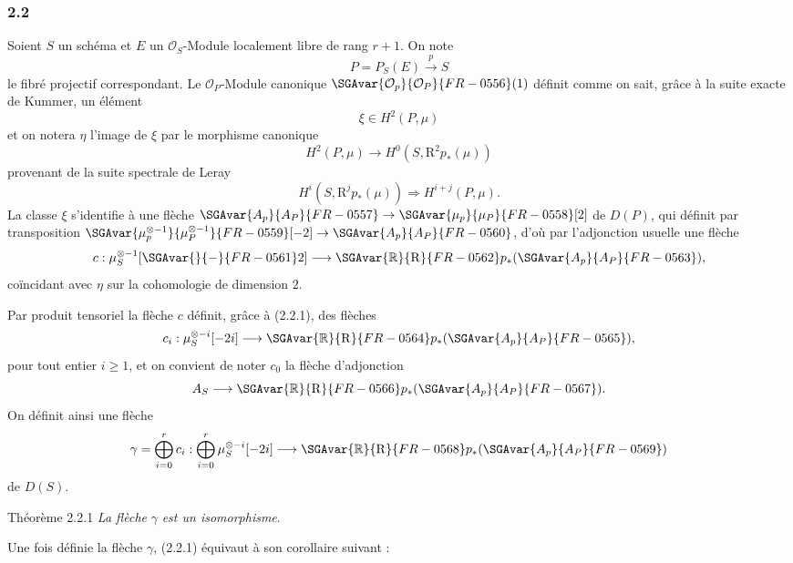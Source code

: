 \subsubsection*{2.2}
Soient $S$ un schéma et $E$ un $\mathcal{O}_S$-Module localement libre de rang $r+1$. On note
\[
P=P_S(E)\xrightarrow{p}S
\]
le fibré projectif correspondant. Le $\mathcal{O}_P$-Module canonique $\SGAvar{\mathcal{O}_p}{\mathcal{O}_P}{FR-0556}(1)$ définit comme on sait, grâce à la suite exacte de Kummer, un élément
\[
\xi\in H^2(P,\mu)
\]
et on notera $\eta$ l'image de $\xi$ par le morphisme canonique
\[
H^2(P,\mu)\longrightarrow H^0(S,\mathrm{R}^2p_*(\mu))
\]
provenant de la suite spectrale de Leray
\[
H^i(S,\mathrm{R}^jp_*(\mu))\Rightarrow H^{i+j}(P,\mu).
\]
La classe $\xi$ s'identifie à une flèche $\SGAvar{A_p}{A_P}{FR-0557}\to\SGAvar{\mu_p}{\mu_P}{FR-0558}[2]$ de $D(P)$, qui définit par transposition $\SGAvar{\mu_p^{\otimes -1}}{\mu_P^{\otimes -1}}{FR-0559}[-2]\to \SGAvar{A_p}{A_P}{FR-0560}$, d'où par l'adjonction usuelle une flèche
\[
c:\mu_S^{\otimes -1}[\SGAvar{}{-}{FR-0561}2]\longrightarrow \SGAvar{\mathbb{R}}{\mathrm{R}}{FR-0562} p_*(\SGAvar{A_p}{A_P}{FR-0563}),
\]
coïncidant avec $\eta$ sur la cohomologie de dimension $2$.

Par
produit tensoriel la flèche $c$ définit, grâce à (2.2.1), des flèches
\[
c_i:\mu_S^{\otimes -i}[-2i]\longrightarrow \SGAvar{\mathbb{R}}{\mathrm{R}}{FR-0564} p_*(\SGAvar{A_p}{A_P}{FR-0565}),
\]
pour tout entier $i\ge1$, et on convient de noter $c_0$ la flèche d'adjonction
\[
A_S\longrightarrow \SGAvar{\mathbb{R}}{\mathrm{R}}{FR-0566} p_*(\SGAvar{A_p}{A_P}{FR-0567}).
\]
On définit ainsi une flèche
\[
\gamma=\bigoplus_{i=0}^{r}c_i:
\bigoplus_{i=0}^{r}\mu_S^{\otimes -i}[-2i]\longrightarrow \SGAvar{\mathbb{R}}{\mathrm{R}}{FR-0568} p_*(\SGAvar{A_p}{A_P}{FR-0569})
\]
de $D(S)$.

\begin{statement}{Théorème 2.2.1}
\emph{La flèche} $\gamma$ \emph{est un isomorphisme}.
\end{statement}

Une fois définie la flèche $\gamma$, (2.2.1) équivaut à son corollaire suivant :

